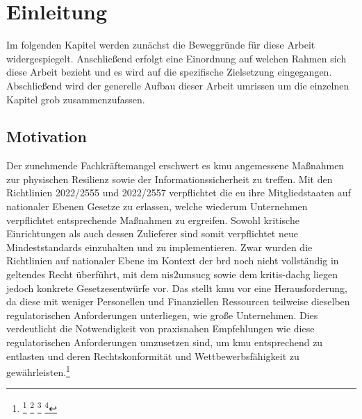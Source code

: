 \documentclass[11pt,a4paper,hidelinks]{article}   %
\begin{document}
    \clearpage

    \newpage
    \tableofcontents
	\newpage
	\listoftables
	\newpage
    \printglossary[type=\acronymtype, title=Abkürzungsverzeichnis, toctitle=Abkürzungsverzeichnis]

    \newpage
    \section{Einleitung}
    Im folgenden Kapitel werden zunächst die Beweggründe für diese Arbeit widergespiegelt. Anschließend erfolgt eine Einordnung auf welchen Rahmen sich diese Arbeit bezieht und es wird auf die spezifische Zielsetzung eingegangen. Abschließend wird der generelle Aufbau dieser Arbeit umrissen um die einzelnen Kapitel grob zusammenzufassen.
    \subsection{Motivation}\label{sec:Einleitung_Motivation} %
        Der zunehmende Fachkräftemangel erschwert es \gls{kmu} angemessene Maßnahmen zur physischen Resilienz sowie der Informationssicherheit zu treffen. Mit den Richtlinien 2022/2555 und 2022/2557 verpflichtet die \gls{eu} ihre Mitgliedstaaten auf nationaler Ebenen Gesetze zu erlassen, welche wiederum Unternehmen verpflichtet entsprechende Maßnahmen zu ergreifen. Sowohl kritische Einrichtungen als auch dessen Zulieferer sind somit verpflichtet neue Mindeststandards einzuhalten und zu implementieren. Zwar wurden die Richtlinien auf nationaler Ebene im Kontext der \gls{brd} noch nicht vollständig in geltendes Recht überführt, mit dem \gls{nis2umsucg} sowie dem \gls{kritis-dachg} liegen jedoch konkrete Gesetzesentwürfe vor. Das stellt \gls{kmu} vor eine Herausforderung, da diese mit weniger Personellen und Finanziellen Ressourcen teilweise dieselben regulatorischen Anforderungen unterliegen, wie große Unternehmen. Dies verdeutlicht die Notwendigkeit von praxisnahen Empfehlungen wie diese regulatorischen Anforderungen umzusetzen sind, um \gls{kmu} entsprechend zu entlasten und deren Rechtskonformität und Wettbewerbsfähigkeit zu gewährleisten.\footnote{
            \footcite[Vgl.][S. 1]{destatis_kmu_beschaeftigte_2022}
            \footcite[Vgl.][S. 10]{dsin_sicherheitsindex_2023}
            \footcite[Vgl.][S. 1 - 2]{bitkom_fachkraeftemangel_2024}
            \footcite[Vgl.][S. 1]{bitkom_fachkraeftemangel_2024}
        }
\end{document}
